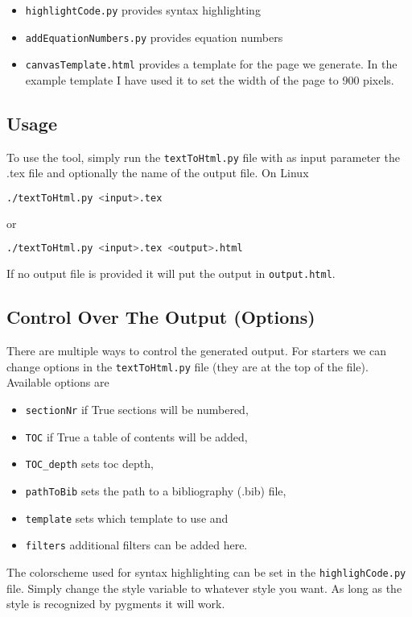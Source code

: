 \documentclass[11pt, a4paper]{article}
\begin{document}
	\begin{itemize}
		\item \lstinline|highlightCode.py| provides syntax highlighting
		\item \lstinline|addEquationNumbers.py| provides equation numbers
		\item \lstinline|canvasTemplate.html| provides a template for the page we generate. In the example template I have used it to set the width of the page to 900 pixels.
	\end{itemize}

	\subsection{Usage}
	To use the tool, simply run the \lstinline|textToHtml.py| file with as input parameter the .tex file and optionally the name of the output file. On Linux
	\begin{lstlisting}[language=bash]
	./textToHtml.py <input>.tex
	\end{lstlisting}
	or
	\begin{lstlisting}[language=bash]
	./textToHtml.py <input>.tex <output>.html
	\end{lstlisting} 
	If no output file is provided it will put the output in \lstinline|output.html|.
	
	\subsection{Control Over The Output (Options)}
	There are multiple ways to control the generated output. For starters we can change options in the \lstinline|textToHtml.py| file (they are at the top of the file). Available options are
	\begin{itemize}
		\item \lstinline|sectionNr| if True sections will be numbered,
		\item \lstinline|TOC| if True a table of contents will be added,
		\item \lstinline|TOC_depth| sets toc depth,
		\item \lstinline|pathToBib| sets the path to a bibliography (.bib) file,
		\item \lstinline|template| sets which template to use and
		\item \lstinline|filters| additional filters can be added here.
	\end{itemize}

	The colorscheme used for syntax highlighting can be set in the \lstinline|highlighCode.py| file. Simply change the style variable to whatever style you want. As long as the style is recognized by pygments it will work.
	
\end{document}
